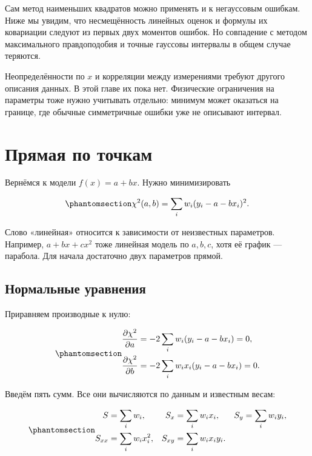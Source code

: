 \documentclass[
  russian,
  11pt,
  a4paper,
  open=any]{scrbook}
\begin{document}
Сам метод наименьших квадратов можно применять и к негауссовым ошибкам.
Ниже мы увидим, что несмещённость линейных оценок и формулы их
ковариации следуют из первых двух моментов ошибок. Но совпадение с
методом максимального правдоподобия и точные гауссовы интервалы в общем
случае теряются.

Неопределённости по \(x\) и корреляции между измерениями требуют другого
описания данных. В этой главе их пока нет. Физические ограничения на
параметры тоже нужно учитывать отдельно: минимум может оказаться на
границе, где обычные симметричные ошибки уже не описывают интервал.

\section{Прямая по
точкам}\label{ux43fux440ux44fux43cux430ux44f-ux43fux43e-ux442ux43eux447ux43aux430ux43c}

Вернёмся к модели \(f(x)=a+bx\). Нужно минимизировать

\begin{equation}\protect\phantomsection\label{eq-ch11-line-chi-square}{
\chi^2(a,b)=\sum_iw_i(y_i-a-bx_i)^2.
}\end{equation}

Слово «линейная» относится к зависимости от неизвестных параметров.
Например, \(a+bx+cx^2\) тоже линейная модель по \(a,b,c\), хотя её
график --- парабола. Для начала достаточно двух параметров прямой.

\subsection{Нормальные
уравнения}\label{ux43dux43eux440ux43cux430ux43bux44cux43dux44bux435-ux443ux440ux430ux432ux43dux435ux43dux438ux44f}

Приравняем производные к нулю:

\begin{equation}\protect\phantomsection\label{eq-ch11-line-stationary-equations}{
\begin{aligned}
\frac{\partial\chi^2}{\partial a}
&=-2\sum_iw_i(y_i-a-bx_i)=0,\\
\frac{\partial\chi^2}{\partial b}
&=-2\sum_iw_ix_i(y_i-a-bx_i)=0.
\end{aligned}
}\end{equation}

Введём пять сумм. Все они вычисляются по данным и известным весам:

\begin{equation}\protect\phantomsection\label{eq-ch11-weighted-sums}{
\begin{aligned}
S&=\sum_iw_i,& S_x&=\sum_iw_ix_i,& S_y&=\sum_iw_iy_i,\\
S_{xx}&=\sum_iw_ix_i^2,& S_{xy}&=\sum_iw_ix_iy_i.
\end{aligned}
}\end{equation}
\end{document}
